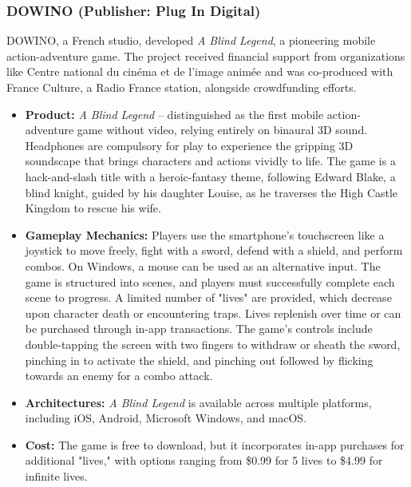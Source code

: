 \subsubsection{DOWINO (Publisher: Plug In Digital)}

DOWINO, a French studio, developed \textit{A Blind Legend}, a pioneering mobile action-adventure game\supercite{WikipediaBlindLegend}. The project received financial support from organizations like Centre national du cinéma et de l'image animée and was co-produced with France Culture, a Radio France station, alongside crowdfunding efforts\supercite{WikipediaBlindLegend}.
\begin{itemize}
    \item \textbf{Product:} \textit{A Blind Legend} – distinguished as the first mobile action-adventure game without video, relying entirely on binaural 3D sound. Headphones are compulsory for play to experience the gripping 3D soundscape that brings characters and actions vividly to life\supercite{WikipediaBlindLegend}. The game is a hack-and-slash title with a heroic-fantasy theme, following Edward Blake, a blind knight, guided by his daughter Louise, as he traverses the High Castle Kingdom to rescue his wife\supercite{WikipediaBlindLegend}.
    \item \textbf{Gameplay Mechanics:} Players use the smartphone's touchscreen like a joystick to move freely, fight with a sword, defend with a shield, and perform combos\supercite{AppleStoreBlindLegend}. On Windows, a mouse can be used as an alternative input\supercite{WikipediaBlindLegend}. The game is structured into scenes, and players must successfully complete each scene to progress. A limited number of "lives" are provided, which decrease upon character death or encountering traps. Lives replenish over time or can be purchased through in-app transactions\supercite{WikipediaBlindLegend}. The game's controls include double-tapping the screen with two fingers to withdraw or sheath the sword, pinching in to activate the shield, and pinching out followed by flicking towards an enemy for a combo attack\supercite{WikipediaBlindLegend}.
    \item \textbf{Architectures:} \textit{A Blind Legend} is available across multiple platforms, including iOS, Android, Microsoft Windows, and macOS\supercite{WikipediaBlindLegend}.
    \item \textbf{Cost:} The game is free to download, but it incorporates in-app purchases for additional "lives," with options ranging from \$0.99 for 5 lives to \$4.99 for infinite lives\supercite{AppleStoreBlindLegend}.
\end{itemize}

